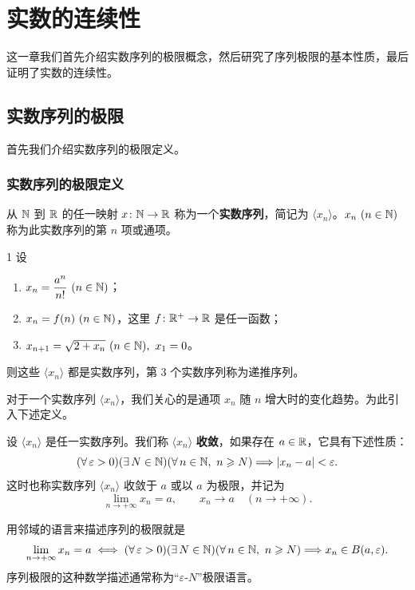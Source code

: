 \chapter{实数的连续性}

这一章我们首先介绍实数序列的极限概念，然后研究了序列极限的基本性质，最后证明了实数的连续性。

\section{实数序列的极限}

首先我们介绍实数序列的极限定义。

\subsection{实数序列的极限定义}
	\label{sec:3-1-1}

\begin{mydef*}{}
从 \(\mathbb{N}\) 到 \(\mathbb{R}\) 的任一映射 \(x\colon\mathbb{N}\to\mathbb{R}\) 称为一个\textbf{实数序列}，简记为
\(\langle x_n\rangle\)。\(x_n\ (n\in\mathbb{N})\) 称为此实数序列的第 \(n\) 项或通项。
\end{mydef*}

\begin{sourceexample}{1}
设
\begin{enumerate}[label=\arabic*)]
  \item \(x_n=\dfrac{a^n}{n!}\ (n\in\N)\)；
  \item \(x_n=f(n)\ (n\in\mathbb{N})\)，这里 \(f\colon\mathbb{R}^+\to\mathbb{R}\) 是任一函数；
  \item \(x_{n+1}=\sqrt{2+x_n}\ (n\in\N),\ x_1=0\)。
\end{enumerate}
则这些 \(\langle x_n\rangle\) 都是实数序列，第 3 个实数序列称为递推序列。
\end{sourceexample}

对于一个实数序列 \(\langle x_n\rangle\)，我们关心的是通项 \(x_n\) 随 \(n\) 增大时的变化趋势。为此引入下述定义。

\begin{mydef*}{}
设 \(\langle x_n\rangle\) 是任一实数序列。我们称 \(\langle x_n\rangle\) \textbf{收敛}，如果存在
\(a\in\mathbb{R}\)，它具有下述性质：
\[
(\forall\,\varepsilon>0)(\exists\,N\in\mathbb{N})
(\forall\,n\in\mathbb{N},\ n\geqslant N)
\Longrightarrow |x_n-a|<\varepsilon.
\]
这时也称实数序列 \(\langle x_n\rangle\) 收敛于 \(a\) 或以 \(a\) 为极限，并记为
\[
\lim_{n\to+\infty}x_n=a,
\qquad
x_n\to a\quad(n\to+\infty).
\]
\end{mydef*}

用邻域的语言来描述序列的极限就是
\[
\lim_{n\to+\infty}x_n=a
\iff
(\forall\,\varepsilon>0)(\exists\,N\in\mathbb{N})
(\forall\,n\in\mathbb{N},\ n\geqslant N)
\Longrightarrow x_n\in B(a,\varepsilon).
\]
序列极限的这种数学描述通常称为“\(\varepsilon\)-\(N\)”极限语言。

